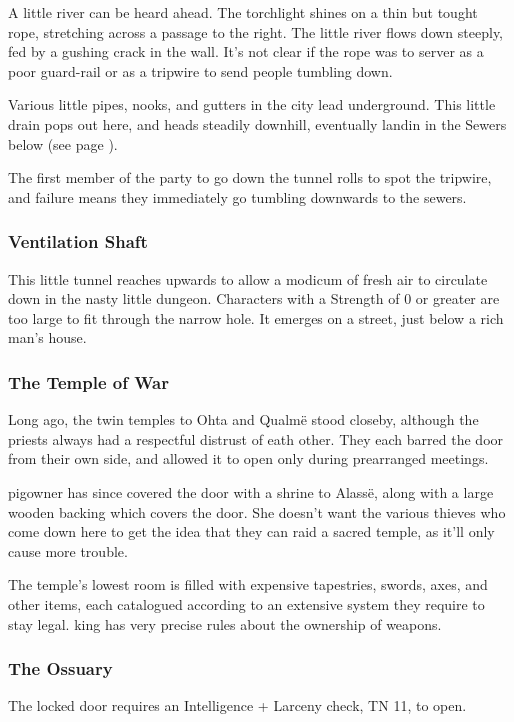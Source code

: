 \begin{boxtext}
	A little river can be heard ahead.  The torchlight shines on a thin but tought rope, stretching across a passage to the right.  The little river flows down steeply, fed by a gushing crack in the wall.  It's not clear if the rope was to server as a poor guard-rail or as a tripwire to send people tumbling down.
\end{boxtext}

Various little pipes, nooks, and gutters in the city lead underground.  This little drain pops out here, and heads steadily downhill, eventually landin in the Sewers below (see page \pageref{slidein}).

The first member of the party to go down the tunnel rolls to spot the tripwire, and failure means they immediately go tumbling downwards to the sewers.

\subsubsection{Ventilation Shaft}
This little tunnel reaches upwards to allow a modicum of fresh air to circulate down in the nasty little dungeon.  Characters with a Strength of 0 or greater are too large to fit through the narrow hole.  It emerges on a street, just below a rich man's house.

\subsubsection{The Temple of War}
Long ago, the twin temples to Ohta and Qualm\"{e} stood closeby, although the priests always had a respectful distrust of eath other.  They each barred the door from their own side, and allowed it to open only during prearranged meetings.

\Gls{pigowner} has since covered the door with a shrine to Alass\"{e}, along with a large wooden backing which covers the door.  She doesn't want the various thieves who come down here to get the idea that they can raid a sacred temple, as it'll only cause more trouble.

The temple's lowest room is filled with expensive tapestries, swords, axes, and other items, each catalogued according to an extensive system they require to stay legal.  \Gls{king} has very precise rules about the ownership of weapons.

\subsubsection{The Ossuary}
The locked door requires an Intelligence + Larceny check, TN 11, to open.

